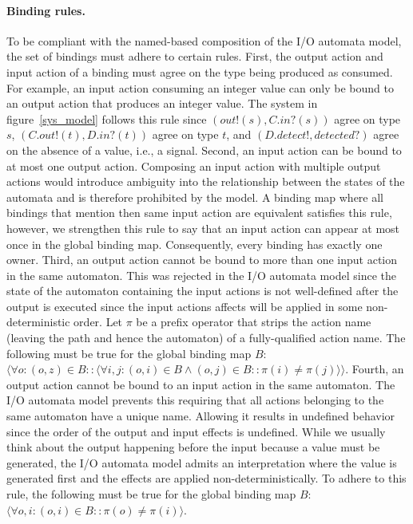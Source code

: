 \paragraph{Binding rules.}
To be compliant with the named-based composition of the I/O automata model, the set of bindings must adhere to certain rules.
First, the output action and input action of a binding must agree on the type being produced as consumed.
For example, an input action consuming an integer value can only be bound to an output action that produces an integer value.
The system in figure~\ref{sys_model} follows this rule since $(out!(s), C.in?(s))$ agree on type $s$, $(C.out!(t), D.in?(t))$ agree on type $t$, and $(D.detect!, detected?)$ agree on the absence of a value, i.e., a signal.
Second, an input action can be bound to at most one output action.
Composing an input action with multiple output actions would introduce ambiguity into the relationship between the states of the automata and is therefore prohibited by the model.
A binding map where all bindings that mention then same input action are equivalent satisfies this rule, however, we strengthen this rule to say that an input action can appear at most once in the global binding map.
Consequently, every binding has exactly one owner.
Third, an output action cannot be bound to more than one input action in the same automaton.
This was rejected in the I/O automata model since the state of the automaton containing the input actions is not well-defined after the output is executed since the input actions affects will be applied in some non-deterministic order.
Let $\pi$ be a prefix operator that strips the action name (leaving the path and hence the automaton) of a fully-qualified action name.
The following must be true for the global binding map $B$:  $\langle \forall o : (o, z) \in B :: \langle \forall i,j : (o, i) \in B \land (o, j) \in B :: \pi (i) \neq \pi (j) \rangle \rangle$.
Fourth, an output action cannot be bound to an input action in the same automaton.
The I/O automata model prevents this requiring that all actions belonging to the same automaton have a unique name.
Allowing it results in undefined behavior since the order of the output and input effects is undefined.
While we usually think about the output happening before the input because a value must be generated, the I/O automata model admits an interpretation where the value is generated first and the effects are applied non-deterministically.
To adhere to this rule, the following must be true for the global binding map $B$:  $\langle \forall o, i : (o, i) \in B :: \pi (o) \neq \pi (i) \rangle$.

